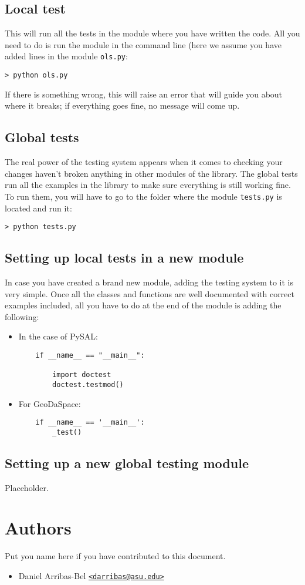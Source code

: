 \documentclass{article}
\begin{document}
\subsection{Local test} 
This will run all the tests in the module where you have written the code. All
you need to do is run the module in the command line (here we assume you have
added lines in the module \texttt{ols.py}:

\begin{verbatim}
> python ols.py
\end{verbatim}

If there is something wrong, this will raise an error that will guide you
about where it breaks; if everything goes fine, no message will come up.

\subsection{Global tests}
The real power of the testing system appears when it comes to checking your
changes haven't broken anything in other modules of the library. The global
tests run all the examples in the library to make sure everything is still
working fine. To run them, you will have to go to the folder where the module
\texttt{tests.py} is located and run it:

\begin{verbatim}
> python tests.py
\end{verbatim}

\subsection{Setting up local tests in a new module}
In case you have created a brand new module, adding the testing system to it
is very simple. Once all the classes and functions are well documented with
correct examples included, all you have to do at the end of the module is
adding the following:

\begin{itemize}
    \item In the case of PySAL:
    \begin{verbatim}
    if __name__ == "__main__":

        import doctest
        doctest.testmod()
    \end{verbatim}
\item For GeoDaSpace:
    \begin{verbatim}
    if __name__ == '__main__':
        _test()
    \end{verbatim}
\end{itemize}

\subsection{Setting up a new global testing module}
Placeholder.

\appendix
\section{Authors}
Put you name here if you have contributed to this document.
\begin{itemize}
    \item Daniel Arribas-Bel
       \href{mailto:darribas@asu.edu}{\texttt{<darribas@asu.edu>}}
\end{itemize}
\end{document}
